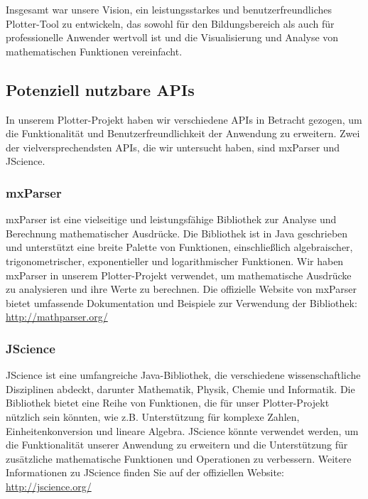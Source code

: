 \documentclass[a4paper]{article}
\begin{document}
Insgesamt war unsere Vision, ein leistungsstarkes und benutzerfreundliches Plotter-Tool zu entwickeln, das sowohl für den Bildungsbereich als auch für professionelle Anwender wertvoll ist und die Visualisierung und Analyse von mathematischen Funktionen vereinfacht.

\subsection{Potenziell nutzbare APIs}

In unserem Plotter-Projekt haben wir verschiedene APIs in Betracht gezogen, um die Funktionalität und Benutzerfreundlichkeit der Anwendung zu erweitern. Zwei der vielversprechendsten APIs, die wir untersucht haben, sind mxParser und JScience.

\subsubsection{mxParser}

mxParser ist eine vielseitige und leistungsfähige Bibliothek zur Analyse und Berechnung mathematischer Ausdrücke. Die Bibliothek ist in Java geschrieben und unterstützt eine breite Palette von Funktionen, einschließlich algebraischer, trigonometrischer, exponentieller und logarithmischer Funktionen. Wir haben mxParser in unserem Plotter-Projekt verwendet, um mathematische Ausdrücke zu analysieren und ihre Werte zu berechnen. Die offizielle Website von mxParser bietet umfassende Dokumentation und Beispiele zur Verwendung der Bibliothek: \url{http://mathparser.org/}

\newpage

\subsubsection{JScience}

JScience ist eine umfangreiche Java-Bibliothek, die verschiedene wissenschaftliche Disziplinen abdeckt, darunter Mathematik, Physik, Chemie und Informatik. Die Bibliothek bietet eine Reihe von Funktionen, die für unser Plotter-Projekt nützlich sein könnten, wie z.B. Unterstützung für komplexe Zahlen, Einheitenkonversion und lineare Algebra. JScience könnte verwendet werden, um die Funktionalität unserer Anwendung zu erweitern und die Unterstützung für zusätzliche mathematische Funktionen und Operationen zu verbessern. Weitere Informationen zu JScience finden Sie auf der offiziellen Website: \url{http://jscience.org/}\\
\end{document}
